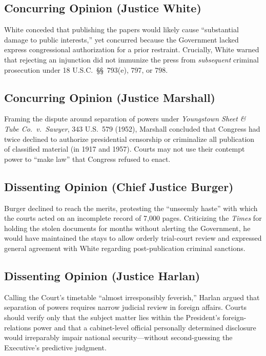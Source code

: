 \documentclass[12pt]{article}
\begin{document}
\subsection{Concurring Opinion (Justice White)}

White conceded that publishing the papers would likely cause ``substantial damage to public interests,'' yet concurred because the Government lacked express congressional authorization for a prior restraint. Crucially, White warned that rejecting an injunction did not immunize the press from \emph{subsequent} criminal prosecution under 18 U.S.C.\ \S\S~793(e), 797, or 798.

\subsection{Concurring Opinion (Justice Marshall)}

Framing the dispute around separation of powers under \textit{Youngstown Sheet \& Tube Co.\ v.\ Sawyer}, 343 U.S.\ 579 (1952), Marshall concluded that Congress had twice declined to authorize presidential censorship or criminalize all publication of classified material (in 1917 and 1957). Courts may not use their contempt power to ``make law'' that Congress refused to enact.

\subsection{Dissenting Opinion (Chief Justice Burger)}

Burger declined to reach the merits, protesting the ``unseemly haste'' with which the courts acted on an incomplete record of 7,000 pages. Criticizing the \textit{Times} for holding the stolen documents for months without alerting the Government, he would have maintained the stays to allow orderly trial-court review and expressed general agreement with White regarding post-publication criminal sanctions.

\subsection{Dissenting Opinion (Justice Harlan)}

Calling the Court's timetable ``almost irresponsibly feverish,'' Harlan argued that separation of powers requires narrow judicial review in foreign affairs. Courts should verify only that the subject matter lies within the President's foreign-relations power and that a cabinet-level official personally determined disclosure would irreparably impair national security---without second-guessing the Executive's predictive judgment.
\end{document}
